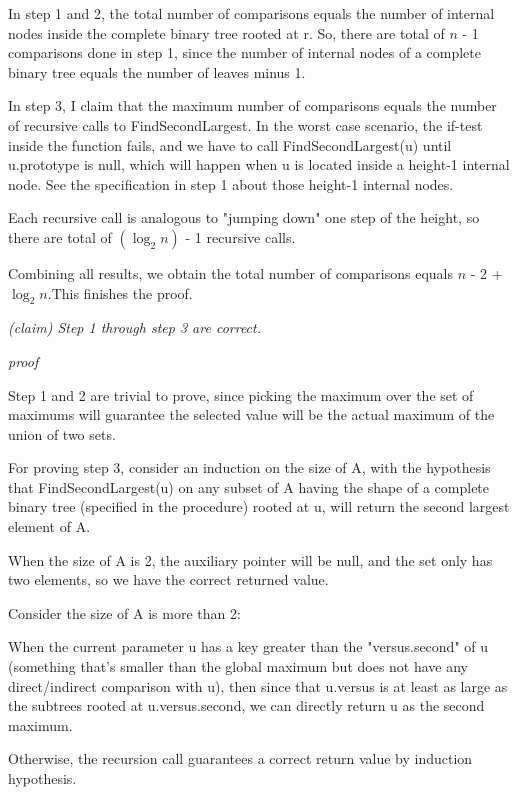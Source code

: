 \documentclass[a4paper, 10pt]{article}
\begin{document}
{\begin{addmargin}[15pt]{0in}
{In step 1 and 2, the total number of comparisons equals the number of internal nodes inside the complete binary tree rooted at r. So, there are total of $n$ - 1 comparisons done in step 1, since the number of internal nodes of a complete binary tree equals the number of leaves minus 1. 

In step 3, I claim that the maximum number of comparisons equals the number of recursive calls to FindSecondLargest. In the worst case scenario, the if-test inside the function fails, and we have to call FindSecondLargest(u) until u.prototype is null, which will happen when u is located inside a height-1 internal node. See the specification in step 1 about those height-1 internal nodes. 

Each recursive call is analogous to "jumping down" one step of the height, so there are total of $(\log_2 n)$ - 1 recursive calls.

Combining all results, we obtain the total number of comparisons equals $n$ - 2 + $\log_2 n.$This finishes the proof.
}
\end{addmargin}
{\it
(claim) Step 1 through step 3 are correct.
}
\begin{addmargin}[15pt]{0in}
{
\textit{proof}

Step 1 and 2 are trivial to prove, since picking the maximum over the set of maximums will guarantee the selected value will be the actual maximum of the union of two sets.

For proving step 3, consider an induction on the size of A, with the hypothesis that FindSecondLargest(u) on any subset of A having the shape of a complete binary tree (specified in the procedure) rooted at u, will return the second largest element of A.

When the size of A is 2, the auxiliary pointer will be null, and the set only has two elements, so we have the correct returned value.

Consider the size of A is more than 2: 

When the current parameter u has a key greater than the "versus.second" of u (something that's smaller than the global maximum but does not have any direct/indirect comparison with u), then since that u.versus is at least as large as the subtrees rooted at u.versus.second, we can directly return u as the second maximum.

Otherwise, the recursion call guarantees a correct return value by induction hypothesis.

}
\end{addmargin}}
\end{document}
